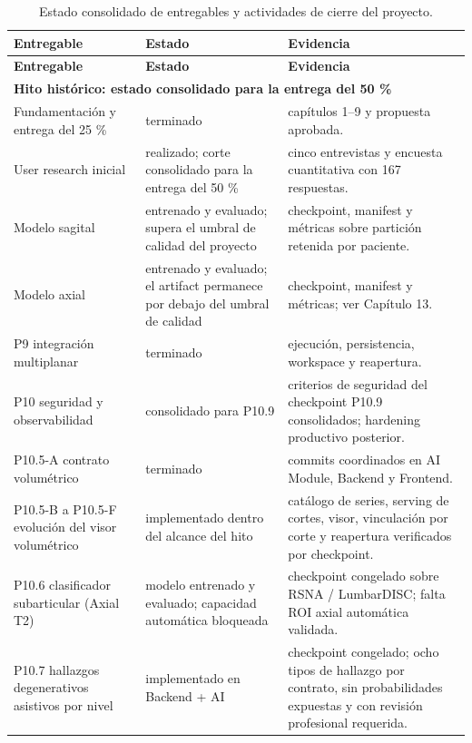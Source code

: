 \begingroup
\scriptsize
\setlength{\tabcolsep}{3pt}
\renewcommand{\arraystretch}{1.18}
\begin{longtable}{|p{}|p{}|p{}|}
\caption{Estado consolidado de entregables y actividades de cierre del proyecto.}\label{tab:plan-roadmap-consolidado}\\
\hline
\textbf{Entregable} & \textbf{Estado} & \textbf{Evidencia} \\
\hline
\endfirsthead
\hline
\textbf{Entregable} & \textbf{Estado} & \textbf{Evidencia} \\
\hline
\endhead
\multicolumn{3}{|l|}{\textbf{Hito histórico: estado consolidado para la entrega del 50 \%}} \\
\hline
Fundamentación y entrega del 25 \% & terminado & capítulos 1--9 y propuesta aprobada. \\
\hline
User research inicial & realizado; corte consolidado para la entrega del 50 \% & cinco entrevistas y encuesta cuantitativa con 167 respuestas. \\
\hline
Modelo sagital & entrenado y evaluado; supera el umbral de calidad del proyecto & checkpoint, manifest y métricas sobre partición retenida por paciente. \\
\hline
Modelo axial & entrenado y evaluado; el artifact permanece por debajo del umbral de calidad & checkpoint, manifest y métricas; ver Capítulo 13. \\
\hline
P9 integración multiplanar & terminado & ejecución, persistencia, workspace y reapertura. \\
\hline
P10 seguridad y observabilidad & consolidado para P10.9 & criterios de seguridad del checkpoint P10.9 consolidados; hardening productivo posterior. \\
\hline
P10.5-A contrato volumétrico & terminado & commits coordinados en AI Module, Backend y Frontend. \\
\hline
P10.5-B a P10.5-F evolución del visor volumétrico & implementado dentro del alcance del hito & catálogo de series, serving de cortes, visor, vinculación por corte y reapertura verificados por checkpoint. \\
\hline
P10.6 clasificador subarticular (Axial T2) & modelo entrenado y evaluado; capacidad automática bloqueada & checkpoint congelado sobre RSNA / LumbarDISC; falta ROI axial automática validada. \\
\hline
P10.7 hallazgos degenerativos asistivos por nivel & implementado en Backend + AI & checkpoint congelado; ocho tipos de hallazgo por contrato, sin probabilidades expuestas y con revisión profesional requerida. \\

\end{longtable}
